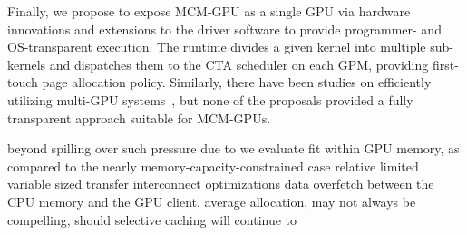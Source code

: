 Finally, we propose to expose MCM-GPU as a single GPU via hardware
innovations and extensions to the driver software to provide
programmer- and OS-transparent execution. The runtime divides a
given kernel into multiple sub-kernels and dispatches them to the CTA
scheduler on each GPM, providing first-touch page allocation policy.
Similarly, there have been studies on efficiently utilizing multi-GPU
systems~\cite{Kim2011,Cabezas2015,lee2013transparent,ben2015memory},
but none of the proposals provided a fully transparent approach
suitable for MCM-GPUs.


% 
beyond
spilling over
such
pressure due to
% 
we evaluate
fit within GPU memory, as compared to the nearly
memory-capacity-constrained case relative 
limited
variable sized transfer interconnect optimizations
data overfetch between the CPU memory and the GPU client.
average
allocation, may not always be compelling, should
selective caching will continue to 
% 
